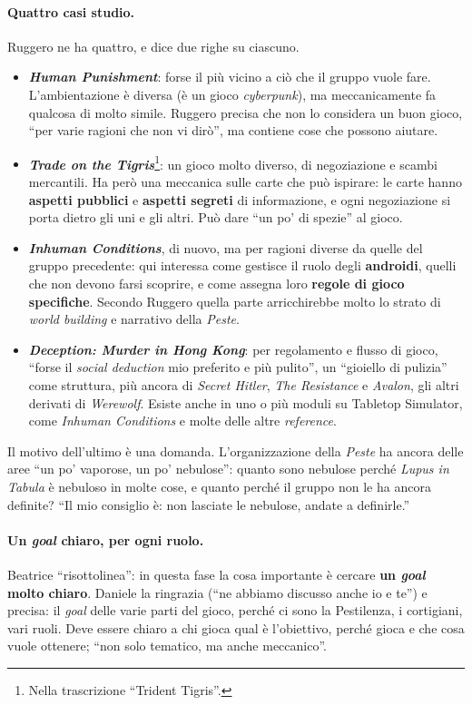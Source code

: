 \paragraph{Quattro casi studio.} Ruggero ne ha quattro, e dice due righe su ciascuno.
\begin{itemize}
  \item \textbf{\emph{Human Punishment}}: forse il più vicino a ciò che il gruppo vuole
        fare. L'ambientazione è diversa (è un gioco \emph{cyberpunk}), ma
        meccanicamente fa qualcosa di molto simile. Ruggero precisa che non lo considera
        un buon gioco, ``per varie ragioni che non vi dirò'', ma contiene cose che
        possono aiutare.
  \item \textbf{\emph{Trade on the Tigris}}\footnote{Nella trascrizione ``Trident
        Tigris''.}: un gioco molto diverso, di negoziazione e scambi mercantili. Ha però
        una meccanica sulle carte che può ispirare: le carte hanno \textbf{aspetti
        pubblici} e \textbf{aspetti segreti} di informazione, e ogni negoziazione si porta
        dietro gli uni e gli altri. Può dare ``un po' di spezie'' al gioco.
  \item \textbf{\emph{Inhuman Conditions}}, di nuovo, ma per ragioni diverse da quelle
        del gruppo precedente: qui interessa come gestisce il ruolo degli
        \textbf{androidi}, quelli che non devono farsi scoprire, e come assegna loro
        \textbf{regole di gioco specifiche}. Secondo Ruggero quella parte arricchirebbe
        molto lo strato di \emph{world building} e narrativo della \emph{Peste}.
  \item \textbf{\emph{Deception: Murder in Hong Kong}}: per regolamento e flusso di gioco,
        ``forse il \emph{social deduction} mio preferito e più pulito'', un ``gioiello di
        pulizia'' come struttura, più ancora di \emph{Secret Hitler}, \emph{The
        Resistance} e \emph{Avalon}, gli altri derivati di \emph{Werewolf}. Esiste anche
        in uno o più moduli su Tabletop Simulator, come \emph{Inhuman Conditions} e molte
        delle altre \emph{reference}.
\end{itemize}
Il motivo dell'ultimo è una domanda. L'organizzazione della \emph{Peste} ha ancora delle
aree ``un po' vaporose, un po' nebulose'': quanto sono nebulose perché \emph{Lupus in
Tabula} è nebuloso in molte cose, e quanto perché il gruppo non le ha ancora definite?
``Il mio consiglio è: non lasciate le nebulose, andate a definirle.''

\paragraph{Un \emph{goal} chiaro, per ogni ruolo.} Beatrice ``risottolinea'': in questa
fase la cosa importante è cercare \textbf{un \emph{goal} molto chiaro}. Daniele la
ringrazia (``ne abbiamo discusso anche io e te'') e precisa: il \emph{goal} delle varie
parti del gioco, perché ci sono la Pestilenza, i cortigiani, vari ruoli. Deve essere
chiaro a chi gioca qual è l'obiettivo, perché gioca e che cosa vuole ottenere; ``non
solo tematico, ma anche meccanico''.

